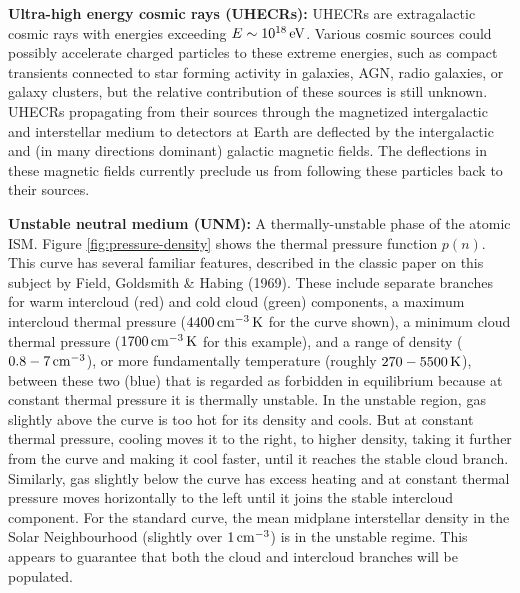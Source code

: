 \documentclass[a4paper,10pt]{article}
\begin{document}
{\noindent}\textbf{Ultra-high energy cosmic rays (UHECRs):} UHECRs are extragalactic cosmic rays with energies exceeding $E\sim10^{18}\,{\rm eV}$. Various cosmic sources could possibly accelerate charged particles to these extreme energies, such as compact transients connected to star forming activity in galaxies, AGN, radio galaxies, or galaxy clusters, but the relative contribution of these sources is still unknown. UHECRs propagating from their sources through the magnetized intergalactic and interstellar medium to detectors at Earth are deflected by the intergalactic and (in many directions dominant) galactic magnetic fields. The deflections in these magnetic fields currently preclude us from following these particles back to their sources.

{\noindent}\textbf{Unstable neutral medium (UNM):} A thermally-unstable phase of the atomic ISM. Figure \ref{fig:pressure-density} shows the thermal pressure function $p(n)$. This curve has several familiar features, described in the classic paper
on this subject by Field, Goldsmith \& Habing (1969). These include separate branches for warm intercloud (red) and cold cloud (green) components, a maximum intercloud thermal pressure ($4400\,{\rm cm^{-3}\,K}$ for the curve shown), a minimum cloud thermal pressure ($1700\,{\rm cm^{-3}\,K}$ for this example), and a range of density ($0.8-7\,{\rm cm^{-3}}$), or more fundamentally temperature (roughly $270-5500\,{\rm K}$), between these two (blue) that is regarded as forbidden in equilibrium because at constant thermal pressure it is thermally unstable. In the unstable region, gas slightly above the curve is too hot for its density and cools. But at constant thermal pressure, cooling moves it to the right, to higher density, taking it further from the curve and making it cool faster, until it reaches the stable cloud branch. Similarly, gas slightly below the curve has excess heating and at constant thermal pressure moves horizontally to the left until it joins the stable intercloud component. For the standard curve, the mean midplane interstellar density in the Solar Neighbourhood (slightly over $1\,{\rm cm^{-3}}$) is in the unstable regime. This appears to guarantee that both the cloud and intercloud branches will be populated.
\end{document}
